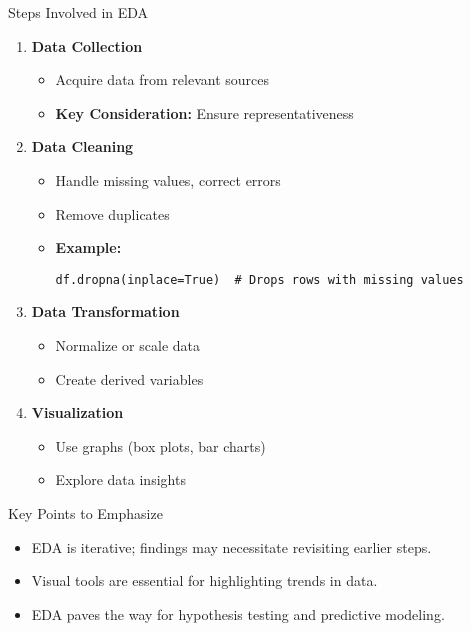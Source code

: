 \documentclass[aspectratio=169]{beamer}
\begin{document}
\begin{frame}[fragile]{Steps Involved in EDA}
    \begin{enumerate}
        \item \textbf{Data Collection}
            \begin{itemize}
                \item Acquire data from relevant sources
                \item \textbf{Key Consideration:} Ensure representativeness
            \end{itemize}
        
        \item \textbf{Data Cleaning}
            \begin{itemize}
                \item Handle missing values, correct errors
                \item Remove duplicates
                \item \textbf{Example:} 
                \begin{lstlisting}
df.dropna(inplace=True)  # Drops rows with missing values
                \end{lstlisting}
            \end{itemize}
        
        \item \textbf{Data Transformation}
            \begin{itemize}
                \item Normalize or scale data
                \item Create derived variables
            \end{itemize}

        \item \textbf{Visualization}
            \begin{itemize}
                \item Use graphs (box plots, bar charts)
                \item Explore data insights
            \end{itemize}
    \end{enumerate}
\end{frame}

\begin{frame}{Key Points to Emphasize}
    \begin{itemize}
        \item EDA is iterative; findings may necessitate revisiting earlier steps.
        \item Visual tools are essential for highlighting trends in data.
        \item EDA paves the way for hypothesis testing and predictive modeling.
    \end{itemize}
\end{frame}
\end{document}
